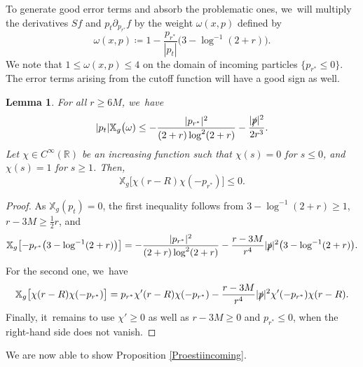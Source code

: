 \documentclass[JEP,XML,SOM,Unicode,published]{cedram}
\theoremstyle{plain}
\newtheorem{lemma}[proposition]{Lemma}
\theoremstyle{definition}
\newcommand\R{{\mathbb{R}}}
\newcommand\T{{\mathbb{X}}}
\begin{document}
To generate good error terms and absorb the problematic ones, we~will multiply the derivatives $Sf$ and $p_t \partial_{p_{r^*}}f$ by the weight $\omega(x,p)$ defined by
\begin{equation}\label{eq:defomegafaraway}
\omega(x,p)\coloneqq 1-\frac{p_{r^*}}{|p_t|}\bigl(3- \log^{-1}(2+r) \bigr).
\end{equation}
We note that $1 \leq \omega(x,p) \leq 4$ on the domain of incoming particles $\{ p_{r^*} \leq 0 \}$. The error terms arising from the cutoff function will have a good sign as well.

\begin{lemma}\label{Lemtruc}
For all $r \geq 6M$, we~have
\[
|p_t| \T_g \bigl(\omega)\leq -\frac{|p_{r^*}|^2}{(2+r) \log^2(2+r)}-\frac{|\slashed{p}|^2}{2r^3}.
\]
Let $ \chi \in C^\infty (\R)$ be an increasing function such that $\chi (s)=0$ for $s \leq 0$, and $\chi(s) =1$ for $s \geq 1$. Then,
\[
\T_g \bigl[ \chi (r-R)\chi (-p_{r^*}) \bigr] \leq 0.
\]
\end{lemma}

\begin{proof}
As $\T_g(p_t)=0$, the first inequality follows from $3- \log^{-1}(2+r) \geq 1$, $r-3M \geq \frac{1}{2}r$, and
\[
\T_g \bigl[ -p_{r^*} \bigl(3- \log^{-1}(2+r) \bigr) \bigr]= -\frac{|p_{r^*}|^2}{(2+r) \log^2(2+r)}-\frac{r-3M}{r^4}|\slashed{p}|^2 \bigl(3- \log^{-1}(2+r)\bigr).
\]
For the second one, we~have
\[
\T_g \bigl[ \chi (r-R)\chi (-p_{r^*}) \bigr]=p_{r^*} \chi'(r-R)\chi (-p_{r^*})-\frac{r-3M}{r^4} |\slashed{p}|^2 \chi'(-p_{r^*})\chi (r-R).
\]
Finally, it~remains to use $ \chi' \geq 0$ as well as $r-3M \geq 0$ and $p_{r^*} \leq 0$, when the right-hand side does not vanish.
\end{proof}

We are now able to show Proposition \ref{Proestiincoming}.
\end{document}
